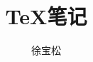 \documentclass[winfonts,UTF8,cs4size,a4paper,fancyhdr,fntef,hyperref]{ctexart}
\begin{document}
\title{\TeX 笔记}
\author{徐宝松}

\maketitle
\begin{multicols}{2}
\tableofcontents
\end{multicols}









\end{document}
